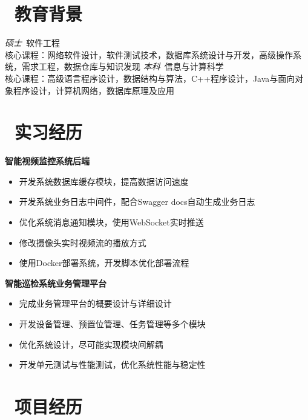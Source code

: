 \documentclass{resume}
\begin{document}


 
\section{\faGraduationCap\  教育背景}
\textit{硕士}\ 软件工程
\\核心课程：网络软件设计，软件测试技术，数据库系统设计与开发，高级操作系统，需求工程，数据仓库与知识发现
\textit{本科}\ 信息与计算科学
\\核心课程：高级语言程序设计，数据结构与算法，C++程序设计，Java与面向对象程序设计，计算机网络，数据库原理及应用

\section{\faBriefcase\ 实习经历}
\textbf{智能视频监控系统后端}
\begin{itemize}
  \item 开发系统数据库缓存模块，提高数据访问速度
  \item 开发系统业务日志中间件，配合Swagger docs自动生成业务日志
  \item 优化系统消息通知模块，使用WebSocket实时推送
  \item 修改摄像头实时视频流的播放方式
  \item 使用Docker部署系统，开发脚本优化部署流程
\end{itemize}

\textbf{智能巡检系统业务管理平台}
\begin{itemize}
  \item 完成业务管理平台的概要设计与详细设计
  \item 开发设备管理、预置位管理、任务管理等多个模块
  \item 优化系统设计，尽可能实现模块间解耦
  \item 开发单元测试与性能测试，优化系统性能与稳定性
\end{itemize}

\section{\faUsers\ 项目经历}
\end{document}
